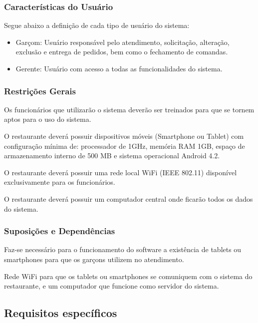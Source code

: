 	\subsubsection{Características do Usuário}
	Segue abaixo a definição de cada tipo de usuário do sistema:
	\begin{itemize}
	\item[] Garçom: Usuário responsável pelo atendimento, solicitação, alteração, exclusão e entrega de pedidos, bem como o fechamento de comandas.
	\item[] Gerente: Usuário com acesso a todas as funcionalidades do sistema.
	\end{itemize}

	\subsubsection{Restrições Gerais}
	Os funcionários que utilizarão o sistema deverão ser treinados para que se tornem aptos para o uso do sistema.
	
	O restaurante deverá possuir dispositivos móveis (Smartphone ou Tablet) com configuração mínima de: processador de 1GHz, memória RAM 1GB, espaço de armazenamento interno de 500 MB e sistema operacional Android 4.2.
	
	O restaurante deverá possuir uma rede local WiFi (IEEE 802.11) disponível exclusivamente para os funcionários.
	
	O restaurante deverá possuir um computador central onde ficarão todos os dados do sistema.
	
	\subsubsection{Suposições e Dependências}
	Faz-se necessário para o funcionamento do software a existência de tablets ou smartphones para que os garçons utilizem no atendimento.
	
	Rede WiFi para que os tablets ou smartphones se comuniquem com o sistema do restaurante, e um computador que funcione como servidor do sistema.
	
	
\subsection{Requisitos específicos}

